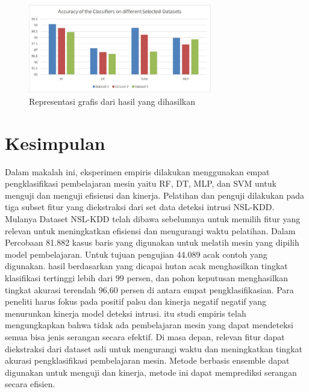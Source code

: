 \documentclass[conference]{IEEEtran}
\begin{document}
\begin{figure}
    \centering
    \includegraphics[width=80mm]{Gambar/gambar3.JPG}
    \caption{Representasi grafis dari hasil yang dihasilkan}
    \label{fig3}
\end{figure}

\section{Kesimpulan}

Dalam makalah ini, eksperimen empiris dilakukan menggunakan empat pengklasifikasi pembelajaran mesin yaitu RF, DT, MLP, dan SVM untuk menguji dan menguji efisiensi dan kinerja. Pelatihan dan penguji dilakukan pada tiga subset fitur yang diekstraksi dari set data deteksi intrusi NSL-KDD. Mulanya Dataset NSL-KDD telah dibawa sebelumnya untuk memilih fitur yang relevan untuk meningkatkan efisiensi dan mengurangi waktu pelatihan. Dalam Percobaan 81.882 kasus baris yang digunakan untuk melatih mesin yang dipilih model pembelajaran. Untuk tujuan pengujian 44.089 acak contoh yang digunakan. hasil berdasarkan yang dicapai hutan acak menghasilkan tingkat klasifikasi tertinggi lebih dari 99 persen, dan pohon keputusan menghasilkan tingkat akurasi terendah 96,60 persen di antara empat pengklasifikasian. Para peneliti harus fokus pada positif palsu dan kinerja negatif negatif yang menurunkan kinerja model deteksi intrusi. itu studi empiris telah mengungkapkan bahwa tidak ada pembelajaran mesin yang dapat mendeteksi semua bisa jenis serangan secara efektif. Di masa depan, relevan fitur dapat diekstraksi dari dataset asli untuk mengurangi waktu dan meningkatkan tingkat akurasi pengklasifikasi pembelajaran mesin. Metode berbasis ensemble dapat digunakan untuk menguji dan kinerja, metode ini dapat memprediksi serangan secara efisien.



\end{document}
